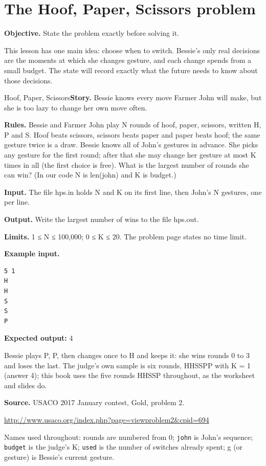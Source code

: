 \documentclass[11pt,a4paper,oneside]{report}
\newcommand{\classref}[1]{\marginpar{\raggedright\fontsize{9}{12}\selectfont\color{quiet}\colorbox{wash}{\heavy\fontsize{8}{10}\selectfont IN THE CLASSROOM}\par\smallskip#1}}
\newcommand{\sectiongoal}[1]{\par{\color{quiet}\textbf{Objective.} #1}\par\smallskip}
\begin{document}
\section{The Hoof, Paper, Scissors problem}
\classref{L5-01}
\sectiongoal{State the problem exactly before solving it.}
This lesson has one main idea: choose when to switch. Bessie's only real decisions are the moments at which she changes gesture, and each change spends from a small budget. The state will record exactly what the future needs to know about those decisions.

\begin{problembox}{Hoof, Paper, Scissors}\textbf{Story.} Bessie knows every move Farmer John will make, but she is too lazy to change her own move often.\par\smallskip \textbf{Rules.} Bessie and Farmer John play N rounds of hoof, paper, scissors, written H, P and S. Hoof beats scissors, scissors beats paper and paper beats hoof; the same gesture twice is a draw. Bessie knows all of John's gestures in advance. She picks any gesture for the first round; after that she may change her gesture at most K times in all (the first choice is free). What is the largest number of rounds she can win? (In our code N is len(john) and K is budget.)\par\smallskip \textbf{Input.} The file hps.in holds N and K on its first line, then John's N gestures, one per line.\par\smallskip \textbf{Output.} Write the largest number of wins to the file hps.out.\par\smallskip \textbf{Limits.} 1 ≤ N ≤ 100,000; 0 ≤ K ≤ 20. The problem page states no time limit.\par\smallskip \textbf{Example input.}
\begin{lstlisting}[language={},aboveskip=2pt,belowskip=2pt]
5 1
H
H
S
S
P
\end{lstlisting}
\textbf{Expected output:} 4\par\smallskip Bessie plays P, P, then changes once to H and keeps it: she wins rounds 0 to 3 and loses the last. The judge's own sample is six rounds, HHSSPP with K = 1 (answer 4); this book uses the five rounds HHSSP throughout, as the worksheet and slides do.\par\smallskip\textbf{Source.} USACO 2017 January contest, Gold, problem 2.\par\url{http://www.usaco.org/index.php?page=viewproblem2&cpid=694}\end{problembox}
Names used throughout: rounds are numbered from 0; \texttt{john} is John's sequence; \texttt{budget} is the judge's K; \texttt{used} is the number of switches already spent; g (or gesture) is Bessie's current gesture.
\end{document}
